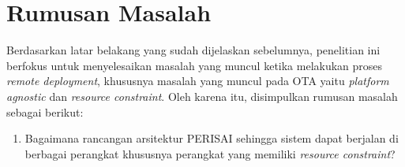 \section{Rumusan Masalah}

Berdasarkan latar belakang yang sudah dijelaskan sebelumnya, penelitian ini berfokus untuk menyelesaikan masalah yang muncul ketika melakukan proses \textit{remote deployment}, khususnya masalah yang muncul pada OTA yaitu \textit{platform agnostic} dan \textit{resource constraint}. Oleh karena itu, disimpulkan rumusan masalah sebagai berikut:

\begin{enumerate}
  \item Bagaimana rancangan arsitektur PERISAI sehingga sistem dapat berjalan di berbagai perangkat khususnya perangkat yang memiliki \textit{resource constraint}?
\end{enumerate}